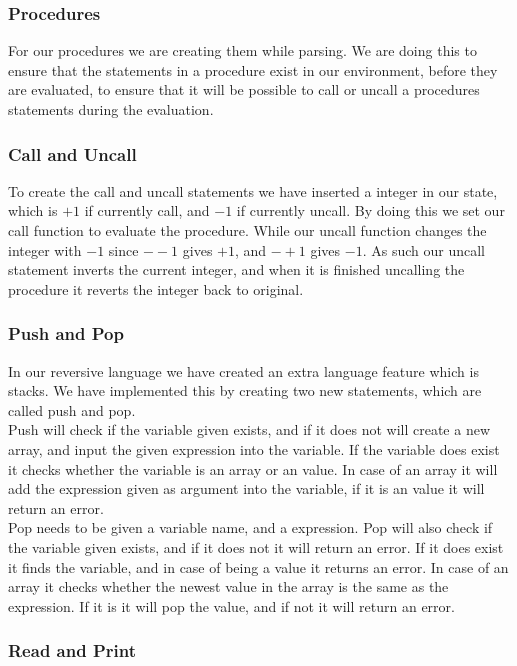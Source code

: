 \documentclass[10pt,a4paper]{article}      %
\begin{document}
\subsubsection*{Procedures}

For our procedures we are creating them while parsing. We are doing this to ensure that the statements in a procedure exist in our environment, before they are evaluated, to ensure that it will be possible to call or uncall a procedures statements during the evaluation.

\subsubsection*{Call and Uncall}

To create the call and uncall statements we have inserted a integer in our state, which is $+1$ if currently call, and $-1$ if currently uncall. By doing this we set our call function to evaluate the procedure. While our uncall function changes the integer with $-1$ since $--1$ gives $+1$, and $-+1$ gives $-1$. As such our uncall statement inverts the current integer, and when it is finished uncalling the procedure it reverts the integer back to original.

\subsubsection*{Push and Pop}

In our reversive language we have created an extra language feature which is stacks. We have implemented this by creating two new statements, which are called push and pop.
\\
Push will check if the variable given exists, and if it does not will create a new array, and input the given expression into the variable. If the variable does exist it checks whether the variable is an array or an value. In case of an array it will add the expression given as argument into the variable, if it is an value it will return an error.
\\
Pop needs to be given a variable name, and a expression. Pop will also check if the variable given exists, and if it does not it will return an error. If it does exist it finds the variable, and in case of being a value it returns an error. In case of an array it checks whether the newest value in the array is the same as the expression. If it is it will pop the value, and if not it will return an error.

\subsubsection*{Read and Print}
\end{document}
